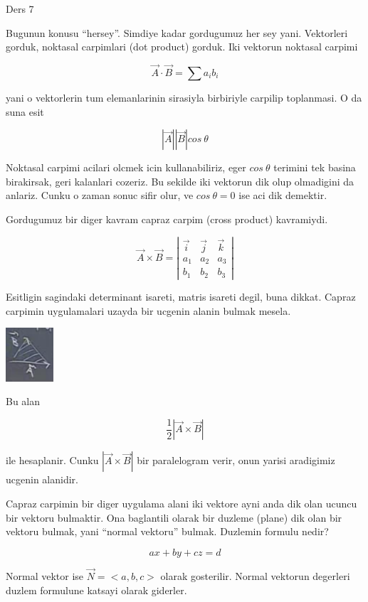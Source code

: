 \documentclass[12pt,fleqn]{article}\usepackage{../common}
\begin{document}
Ders 7

Bugunun konusu ``hersey''. Simdiye kadar gordugumuz her sey
yani. Vektorleri gorduk, noktasal carpimlari (dot product) gorduk. Iki
vektorun noktasal carpimi

\[ \vec{A} \cdot \vec{B} = \sum a_ib_i\]

yani o vektorlerin tum elemanlarinin sirasiyla birbiriyle carpilip
toplanmasi. O da suna esit

\[ |\vec{A}||\vec{B}|cos \ \theta \]

Noktasal carpimi acilari olcmek icin kullanabiliriz, eger $cos \ \theta$
terimini tek basina birakirsak, geri kalanlari cozeriz. Bu sekilde iki
vektorun dik olup olmadigini da anlariz. Cunku o zaman sonuc sifir olur, ve
$cos \ \theta = 0$ ise aci dik demektir. 

Gordugumuz bir diger kavram capraz carpim (cross product) kavramiydi. 

\[ \vec{A} \times \vec{B} = 
\left|\begin{array}{rrr}
\vec{i} & \vec{j} & \vec{k}  \\
a_1 & a_2 & a_3 \\
b_1 & b_2 & b_3 
\end{array}\right|
\]

Esitligin sagindaki determinant isareti, matris isareti degil, buna
dikkat. Capraz carpimin uygulamalari uzayda bir ucgenin alanin bulmak
mesela. 

\includegraphics[height=2cm]{7_1.png}

Bu alan

\[ \frac{1}{2}|\vec{A} \times \vec{B}| \]

ile hesaplanir. Cunku $|\vec{A} \times \vec{B}|$ bir paralelogram verir, onun yarisi 
aradigimiz ucgenin alanidir.

Capraz carpimin bir diger uygulama alani iki vektore ayni anda dik olan
ucuncu bir vektoru bulmaktir. Ona baglantili olarak bir duzleme (plane) dik
olan bir vektoru bulmak, yani ``normal vektoru'' bulmak. Duzlemin formulu
nedir? 

\[ ax + by + cz  = d \]

Normal vektor ise $\vec{N} = <a,b,c>$ olarak gosterilir. Normal vektorun
degerleri duzlem formulune katsayi olarak giderler. 
\end{document}

